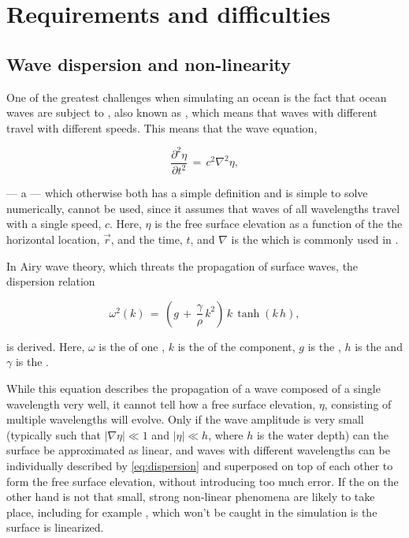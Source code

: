 \chapter{Requirements and difficulties}

\section{Wave dispersion and non-linearity}

One of the greatest challenges when simulating an ocean is the fact that ocean waves are subject to , also known as , which means that waves with different \wavelengths travel with different speeds. This means that the wave equation,

\begin{equation} \label{eq:wave_equation}
\frac{\partial^2 \eta}{\partial t^2} \,=\, c^2\nabla^2\eta,
\end{equation}

--- a \PDE\xspace --- which otherwise both has a simple definition and is simple to solve numerically, cannot be used, since it assumes that waves of all wavelengths travel with a single speed, $c$. Here, $\eta$ is the free surface elevation as a function of the the horizontal location, $\vec{r}$, and the time, $t$, and $\nabla$ is the  which is commonly used in .

In Airy wave theory, which threats the propagation of surface waves, the dispersion relation

\begin{equation} \label{eq:dispersion}
\omega^2(k) \,=\, \left(g\,+\,\frac{\gamma}{\rho}\,k^2\right)\,k\,\tanh(k\,h),
\end{equation}

is derived. Here, $\omega$ is the  of one , $k$ is the  of the component, $g$ is the , $h$ is the  and $\gamma$ is the .

While this equation describes the propagation of a wave composed of a single wavelength very well, it cannot tell how a free surface elevation, $\eta$, consisting of multiple wavelengths will evolve. Only if the wave amplitude is very small (typically such that $|\nabla\eta| \ll 1$ and $|\eta| \ll h$, where $h$ is the water depth) can the surface be approximated as linear, and waves with different wavelengths can be individually described by \eqref{eq:dispersion} and superposed on top of each other to form the free surface elevation, without introducing too much error. If the  on the other hand is not that small, strong non-linear phenomena are likely to take place, including for example , which won't be caught in the simulation is the surface is linearized.

